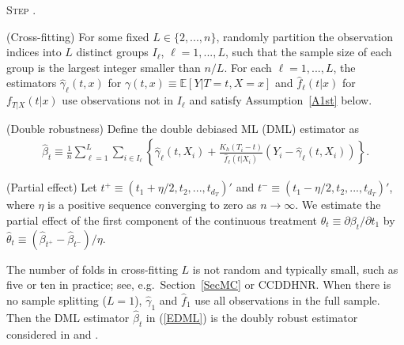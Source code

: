 \documentclass[lettersize, 12pt]{article}
\newcounter{bean}
\begin{document}
       \setcounter{bean}{0}
       \begin{center}
        \begin{list}
         {\textsc{Step} .}{}
\item  (Cross-fitting)
For some fixed $L \in \{2,...,n\}$, randomly partition the observation indices into $L$ distinct groups $I_\ell$, $\ell=1,...,L$, 
such that the sample size of each group is the largest integer smaller than $n/L$. 
For each $\ell=1,...,L$, the estimators $\hat \gamma_\ell(t,x)$ for $\gamma(t,x) \equiv \mathbb{E}[Y|T=t, X=x]$ and $\hat f_\ell(t|x)$ for $f_{T|X}(t|x)$ use observations not in $I_\ell$
and satisfy Assumption~\ref{A1st} below. 

\item (Double robustness)
Define the double debiased ML (DML) estimator as
\begin{align}
\hat \beta_t \equiv \frac{1}{n}\sum_{\ell=1}^L \sum_{i \in I_\ell} \left\{ \hat \gamma_\ell (t, X_i) + \frac{K_h(T_i - t)}{ \hat f_\ell(t|X_i)} \left( Y_i - \hat \gamma_\ell(t,X_i) \right)\right\}.
\label{EDML}
\end{align}

\item (Partial effect)
Let $t^+ \equiv (t_1 + \eta/2, t_2,..., t_{d_T})'$ and $t^- \equiv (t_1 - \eta/2, t_2,..., t_{d_T})'$, where $\eta$ is a positive sequence converging to zero as $n \rightarrow \infty$.
We estimate the partial effect of the first component of the continuous treatment $\theta_t \equiv \partial \beta_t/\partial t_1$ 
by $\hat \theta_{t} \equiv (\hat \beta_{t^+} - \hat \beta_{t^-})/\eta$.

        \end{list}
       \end{center}
       
       The number of folds in cross-fitting $L$ is not random and typically small, such as five or ten in practice; see, e.g.\ Section~\ref{SecMC} or CCDDHNR.  
When there is no sample splitting ($L=1$), $\hat \gamma_1$ and $\hat f_1$ use all observations in the full sample. 
Then the DML estimator $\hat\beta_t$ in (\ref{EDML}) is the doubly robust estimator considered in \cite{Kallus} and \cite{SUZ}.

\end{document}

